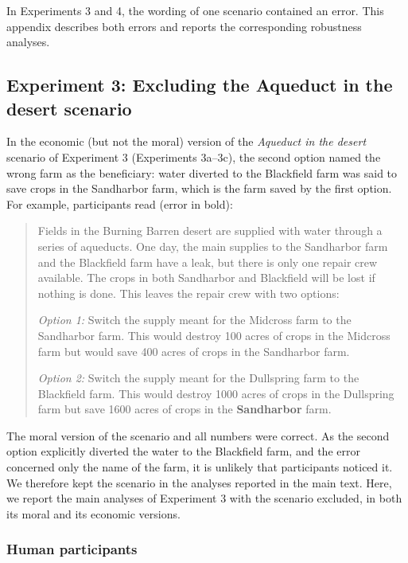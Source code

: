 \documentclass[
]{article}
\begin{document}
In Experiments 3 and 4, the wording of one scenario contained an error. This appendix describes both errors and reports the corresponding robustness analyses.

\subsection{Experiment 3: Excluding the Aqueduct in the desert scenario}\label{app:scenario-errors-exp3}

In the economic (but not the moral) version of the \emph{Aqueduct in the desert} scenario of Experiment 3 (Experiments 3a--3c), the second option named the wrong farm as the beneficiary: water diverted to the Blackfield farm was said to save crops in the Sandharbor farm, which is the farm saved by the first option. For example, participants read (error in bold):

\begin{quote}
Fields in the Burning Barren desert are supplied with water through a series of aqueducts. One day, the main supplies to the Sandharbor farm and the Blackfield farm have a leak, but there is only one repair crew available. The crops in both Sandharbor and Blackfield will be lost if nothing is done. This leaves the repair crew with two options:

\emph{Option 1:} Switch the supply meant for the Midcross farm to the Sandharbor farm. This would destroy 100 acres of crops in the Midcross farm but would save 400 acres of crops in the Sandharbor farm.

\emph{Option 2:} Switch the supply meant for the Dullspring farm to the Blackfield farm. This would destroy 1000 acres of crops in the Dullspring farm but save 1600 acres of crops in the \textbf{Sandharbor} farm.
\end{quote}

The moral version of the scenario and all numbers were correct. As the second option explicitly diverted the water to the Blackfield farm, and the error concerned only the name of the farm, it is unlikely that participants noticed it. We therefore kept the scenario in the analyses reported in the main text. Here, we report the main analyses of Experiment 3 with the scenario excluded, in both its moral and its economic versions.

\subsubsection{Human participants}\label{human-participants}
\end{document}
